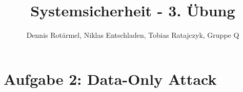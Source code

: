 \documentclass[]{scrreprt}
\title{Systemsicherheit - 3. Übung}
\author{Dennis Rotärmel, Niklas Entschladen, Tobias Ratajczyk, Gruppe Q}
\begin{document}
	
	\maketitle
	
	\section{Aufgabe 2: Data-Only Attack}
	
\end{document}
